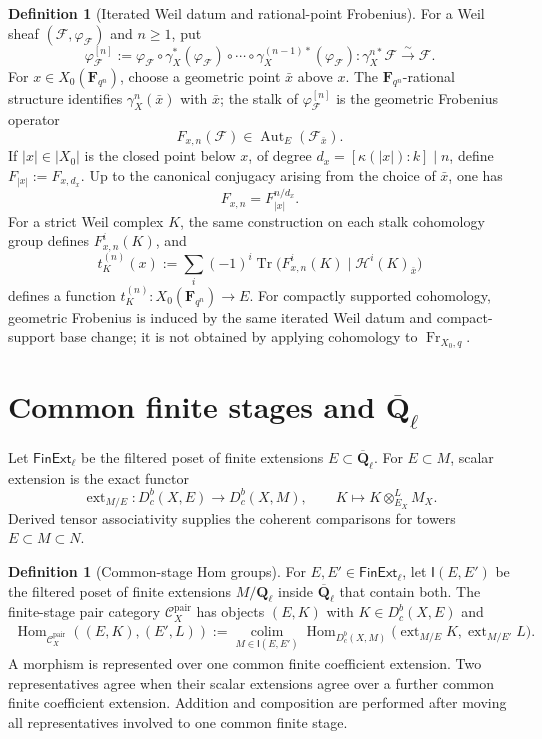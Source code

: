 \documentclass[10pt]{article}
\theoremstyle{definition}
\newtheorem{definition}[theorem]{Definition}
\newcommand{\Ql}{\mathbf Q_\ell}
\newcommand{\Qlb}{\overline{\mathbf Q}_\ell}
\newcommand{\Hom}{\operatorname{Hom}}
\begin{document}
\begin{definition}[Iterated Weil datum and rational-point Frobenius]
For a Weil sheaf \((\mathcal F,\varphi_{\mathcal F})\) and \(n\geq1\), put
\[
 \varphi_{\mathcal F}^{[n]}:=
 \varphi_{\mathcal F}\circ\gamma_X^*(\varphi_{\mathcal F})\circ
 \cdots\circ\gamma_X^{(n-1)*}(\varphi_{\mathcal F}):
 \gamma_X^{n*}\mathcal F\xrightarrow{\sim}\mathcal F.
\]
For \(x\in X_0(\mathbf F_{q^n})\), choose a geometric point \(\bar x\)
above \(x\).  The \(\mathbf F_{q^n}\)-rational structure identifies
\(\gamma_X^n(\bar x)\) with \(\bar x\); the stalk of
\(\varphi_{\mathcal F}^{[n]}\) is the geometric Frobenius operator
\[
 F_{x,n}(\mathcal F)\in
 \operatorname{Aut}_E(\mathcal F_{\bar x}).
\]
If \(|x|\in|X_0|\) is the closed point below \(x\), of degree
\(d_x=[\kappa(|x|):k]\mid n\), define
\(F_{|x|}:=F_{x,d_x}\).  Up to the canonical conjugacy arising from the
choice of \(\bar x\), one has
\[
                   F_{x,n}=F_{|x|}^{n/d_x}.
\]
For a strict Weil complex \(K\), the same construction on each stalk
cohomology group defines \(F_{x,n}^i(K)\), and
\[
 t_K^{(n)}(x):=\sum_i(-1)^i
     \operatorname{Tr}\bigl(F_{x,n}^i(K)\mid\mathcal H^i(K)_{\bar x}\bigr)
\]
defines a function \(t_K^{(n)}:X_0(\mathbf F_{q^n})\to E\).
For compactly supported cohomology, geometric Frobenius is induced by the
same iterated Weil datum and compact-support base change; it is not obtained
by applying cohomology to \(\operatorname{Fr}_{X_0,q}\).
\end{definition}

\section{Common finite stages and \texorpdfstring{$\Qlb$}{Qbar-l}}

Let \(\mathsf{FinExt}_\ell\) be the filtered poset of finite extensions
\(E\subset\Qlb\).  For \(E\subset M\), scalar extension is the exact functor
\[
 \operatorname{ext}_{M/E}:D^b_c(X,E)\longrightarrow D^b_c(X,M),
 \qquad K\longmapsto K\otimes^L_{E_X}M_X.
\]
Derived tensor associativity supplies the coherent comparisons for towers
\(E\subset M\subset N\).

\begin{definition}[Common-stage Hom groups]
For \(E,E'\in\mathsf{FinExt}_\ell\), let \(\mathsf I(E,E')\) be the filtered
poset of finite extensions \(M/\Ql\) inside \(\Qlb\) that contain both.  The finite-stage
pair category \(\mathcal C_X^{\mathrm{pair}}\) has objects \((E,K)\) with
\(K\in D^b_c(X,E)\) and
\[
\begin{aligned}
 \Hom_{\mathcal C_X^{\mathrm{pair}}}((E,K),(E',L))
 :=\operatorname*{colim}_{M\in\mathsf I(E,E')}
 \Hom_{D^b_c(X,M)}
 \bigl(\operatorname{ext}_{M/E}K,\operatorname{ext}_{M/E'}L\bigr).
\end{aligned}
\]
A morphism is represented over one common finite coefficient extension.
Two representatives agree when their scalar extensions agree over a
further common finite coefficient extension.  Addition and composition are performed after moving
all representatives involved to one common finite stage.
\end{definition}
\end{document}
